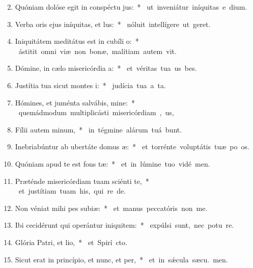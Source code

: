 \begin{flushleft}
\begin{enumerate}[leftmargin=*]
\setcounter{enumi}{1}

\item Quóniam dolóse egit in conspéctu jus:~* \mbox{ ut inveniátur iníquitas e  dium.}
\item Verba oris ejus iníquitas, et lus:~* \mbox{ nóluit intellígere ut  geret.}
\item Iniquitátem meditátus est in cubíli o:~* \mbox{ ástitit omni viæ non bonæ, malítiam autem  vit.}
\item Dómine, in cælo misericórdia a:~* \mbox{ et véritas tua us  bes.}
\item Justítia tua sicut montes i:~* \mbox{ judícia tua a ta.}
\item Hómines, et juménta salvábis, mine:~* \mbox{ quemádmodum multiplicásti misericórdiam , us,}
\item Fílii autem minum,~* \mbox{ in tégmine alárum tuá bunt.}
\item Inebriabúntur ab ubertáte domus æ:~* \mbox{ et torrénte voluptátis tuæ po os.}
\item Quóniam apud te est fons tæ:~* \mbox{ et in lúmine tuo vidé men.}
\item Præténde misericórdiam tuam sciénti te,~* \mbox{ et justítiam tuam his, qui re  de.}
\item Non véniat mihi pes subiæ:~* \mbox{ et manus peccatóris non  me.}
\item Ibi cecidérunt qui operántur iniquitem:~* \mbox{ expúlsi sunt, nec potu re.}
\item Glória Patri, et lio,~* \mbox{ et Spirí cto.}
\item Sicut erat in princípio, et nunc, et per,~* \mbox{ et in s\'{\ae}cula sæcu. men.}

\end{enumerate}
\end{flushleft}


